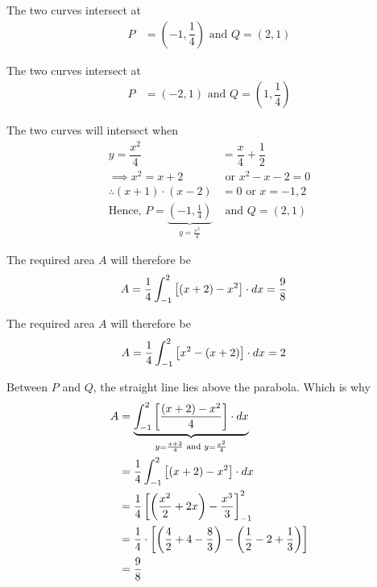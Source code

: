 \documentclass[14pt,fleqn]{extarticle}
\begin{document}
\newcard

The two curves intersect at 
\begin{align}
P &= \left( -1, \dfrac{1}{4}\right)  \text{ and } Q = \left( 2, 1\right) 
\end{align} 

\newcard

The two curves intersect at 
\begin{align}
P &= \left( -2, 1\right)  \text{ and } Q = \left( 1, \dfrac{1}{4}\right) 
\end{align} 

\newcard

The two curves will intersect when 
%
\begin{align}
y = \dfrac{x^2}{4} &= \dfrac{x}{4} + \dfrac{1}{2} \\ 
\implies x^2 = x + 2 &\text{ or } x^2 - x - 2 = 0 \\ 
\therefore (x+1)\cdot (x-2) &= 0  \text{ or }  x = -1, 2 \\
\text{Hence, }P = \underbrace{\left( -1,\frac{1}{4}\right)}_{y=\frac{x^2}{4}} & \text{ and } Q = \left(2,1 \right) 
\end{align}

\newcard

The required area $A$ will therefore be 
\begin{align}
	A &= \frac{1}{4}\int_{-1}^2 \left[\left(x+2 \right) - x^2\right]\cdot dx = \frac{9}{8}
\end{align}

\newcard 

The required area $A$ will therefore be 
\begin{align}
	A &= \frac{1}{4}\int_{-1}^2 \left[x^2 - \left(x+2 \right) \right]\cdot dx = 2
\end{align}

\newcard 

Between $P$ and $Q$, the straight line lies above the parabola. Which is why 
\begin{align}
	A &= \underbrace{\int_{-1}^2 \left[ \frac{\left(x+2 \right) - x^2}{4} \right]\cdot dx}_{y = \frac{x+2}{4}\text{ and } y = \frac{x^2}{4}} \\
	&= \frac{1}{4}\int_{-1}^2 \left[ \left(x+2 \right) - x^2 \right]\cdot dx \\
	&= \frac{1}{4} \left[ \left(\frac{x^2}{2} + 2x \right) - \frac{x^3}{3} \right]_{-1}^2 \\
	&= \dfrac{1}{4}\cdot\left[ \left( \dfrac{4}{2}+4-\dfrac{8}{3}\right) 
- \left( \dfrac{1}{2}-2+\dfrac{1}{3}\right)\right]\\
&= \dfrac{9}{8}
\end{align}
\end{document}
